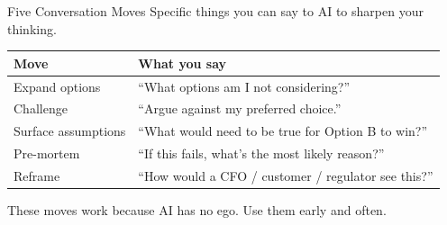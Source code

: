 \documentclass[aspectratio=169]{beamer}
\begin{document}
\begin{frame}{Five Conversation Moves}
Specific things you can say to AI to sharpen your thinking.
\vspace{0.3cm}
\begin{center}\small
\begin{tabular}{@{}ll@{}}
\toprule
\textbf{Move} & \textbf{What you say} \\
\midrule
Expand options & ``What options am I not considering?'' \\
Challenge & ``Argue against my preferred choice.'' \\
Surface assumptions & ``What would need to be true for Option B to win?'' \\
Pre-mortem & ``If this fails, what's the most likely reason?'' \\
Reframe & ``How would a CFO / customer / regulator see this?'' \\
\bottomrule
\end{tabular}
\end{center}
\vspace{0.3cm}
These moves work because AI has no ego.  Use them early and often.
\end{frame}
\end{document}
